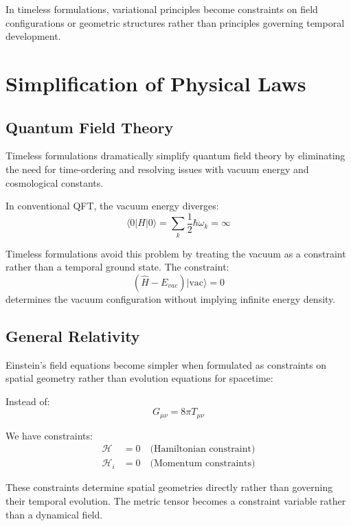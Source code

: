 \documentclass[12pt]{article}
\begin{document}
In timeless formulations, variational principles become constraints on field configurations or geometric structures rather than principles governing temporal development.

\section{Simplification of Physical Laws}

\subsection{Quantum Field Theory}

Timeless formulations dramatically simplify quantum field theory by eliminating the need for time-ordering and resolving issues with vacuum energy and cosmological constants.

In conventional QFT, the vacuum energy diverges:
\begin{equation}
\langle 0|H|0\rangle = \sum_k \frac{1}{2}\hbar\omega_k = \infty
\end{equation}

Timeless formulations avoid this problem by treating the vacuum as a constraint rather than a temporal ground state. The constraint:
\begin{equation}
(\hat{H} - E_{vac})|\text{vac}\rangle = 0
\end{equation}
determines the vacuum configuration without implying infinite energy density.

\subsection{General Relativity}

Einstein's field equations become simpler when formulated as constraints on spatial geometry rather than evolution equations for spacetime:

Instead of:
\begin{equation}
G_{\mu\nu} = 8\pi T_{\mu\nu}
\end{equation}

We have constraints:
\begin{align}
\mathcal{H} &= 0 \quad \text{(Hamiltonian constraint)} \\
\mathcal{H}_i &= 0 \quad \text{(Momentum constraints)}
\end{align}

These constraints determine spatial geometries directly rather than governing their temporal evolution. The metric tensor becomes a constraint variable rather than a dynamical field.
\end{document}
